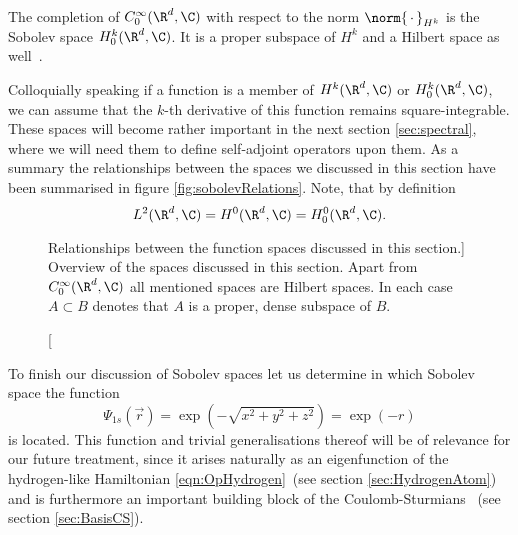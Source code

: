 \begin{defn}
	The completion of $C^\infty_0(\R^d, \C)$
	with respect to the norm $\norm{\slot}_{H^k}$
	is the Sobolev space $H^k_0(\R^d, \C)$.
	It is a proper subspace of $H^k$ and a Hilbert space as well~\cite{Adams2003}.
\end{defn}
Colloquially speaking if a function is a member of $H^k(\R^d, \C)$ or $H^k_0(\R^d, \C)$,
we can assume that the $k$-th derivative of this function remains square-integrable.
These spaces will become rather important in the next section \vref{sec:spectral},
where we will need them to define self-adjoint operators upon them.
As a summary the relationships between the spaces we discussed
in this section have been summarised in figure \vref{fig:sobolevRelations}.
Note, that by definition
\[ L^2(\R^d, \C) = H^0(\R^d, \C) = H^0_0(\R^d, \C). \]

\begin{figure}
	\centering
	\caption
		[Relationships between the function spaces discussed in this section.]
		{Overview of the spaces discussed in this section.
		Apart from $C^\infty_0(\R^d, \C)$ all mentioned spaces are Hilbert spaces.
		In each case $A \subset B$ denotes that $A$ is a proper, dense
		subspace of $B$.}
	\label{fig:sobolevRelations}
\end{figure}

To finish our discussion of Sobolev spaces let us determine
in which Sobolev space the function
\begin{equation}
	\label{eqn:H1sFunctionalForm}
	\Psi_{1s}(\vec{r}) = \exp\left(- \sqrt{x^2 + y^2 + z^2} \right) = \exp(-r)
\end{equation}
is located.
This function and trivial generalisations thereof
will be of relevance for our future treatment,
since it arises naturally as an eigenfunction of the hydrogen-like
Hamiltonian \eqref{eqn:OpHydrogen}~(see section \vref{sec:HydrogenAtom})
and is furthermore an important building block of the Coulomb-Sturmians%
~(see section \vref{sec:BasisCS}).

